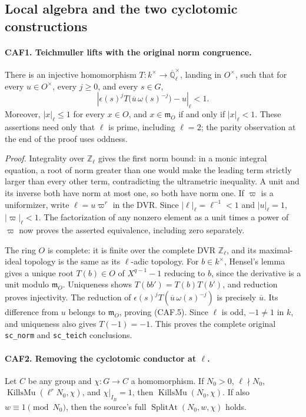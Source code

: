 \subsection{Local algebra and the two cyclotomic constructions}

\paragraph{CAF1. Teichmuller lifts with the original norm congruence.}
\label{claim:CAF1}
There is an injective homomorphism
\(T:k^\times\to\overline{\mathbb Q}_\ell^\times\), landing in
\(O^\times\), such that for every \(u\in O^\times\), every
\(j\ge0\), and every \(s\in G\),
\[
 \left|\epsilon(s)^j
       T\bigl(\overline u\,\omega(s)^{-j}\bigr)-u\right|_\ell<1.
 \tag{CAF.5}
\]
Moreover, \(|x|_\ell\le1\) for every \(x\in O\), and
\(x\in\mathfrak m_O\) if and only if \(|x|_\ell<1\).
These assertions need only that \(\ell\) is prime, including
\(\ell=2\); the parity observation at the end of the proof uses
oddness.

\emph{Proof.}
Integrality over \(\mathbb Z_\ell\) gives the first norm bound: in a
monic integral equation, a root of norm greater than one would make
the leading term strictly larger than every other term, contradicting
the ultrametric inequality.  A unit and its inverse both have norm at
most one, so both have norm one.  If \(\varpi\) is a uniformizer,
write \(\ell=u\varpi^r\) in the DVR.  Since
\(|\ell|_\ell=\ell^{-1}<1\) and \(|u|_\ell=1\),
\(|\varpi|_\ell<1\).  The factorization of any nonzero element as a
unit times a power of \(\varpi\) now proves the asserted equivalence,
including zero separately.

The ring \(O\) is complete: it is finite over the complete DVR
\(\mathbb Z_\ell\), and its maximal-ideal topology is the same as
its \(\ell\)-adic topology.  For \(b\in k^\times\), Hensel's lemma
gives a unique root \(T(b)\in O\) of \(X^{q-1}-1\) reducing to
\(b\), since the derivative is a unit modulo \(\mathfrak m_O\).
Uniqueness shows \(T(bb')=T(b)T(b')\), and reduction proves
injectivity.  The reduction of
\(\epsilon(s)^jT(\overline u\,\omega(s)^{-j})\) is precisely
\(\overline u\).  Its difference from \(u\) belongs to
\(\mathfrak m_O\), proving (CAF.5).  Since \(\ell\) is odd,
\(-1\ne1\) in \(k\), and uniqueness also gives \(T(-1)=-1\).
This proves the complete original \texttt{sc\_norm} and
\texttt{sc\_teich} conclusions.

\paragraph{CAF2. Removing the cyclotomic conductor at \(\ell\).}
\label{claim:CAF2}
Let \(C\) be any group and \(\chi:G\to C\) a homomorphism.
If \(N_0>0\), \(\ell\nmid N_0\),
\(\operatorname{KillsMu}(\ell^rN_0,\chi)\), and
\(\chi|_{I_B}=1\), then
\(\operatorname{KillsMu}(N_0,\chi)\).
If also \(w\equiv1\pmod {N_0}\), then the source's full
\(\operatorname{SplitAt}(N_0,w,\chi)\) holds.

